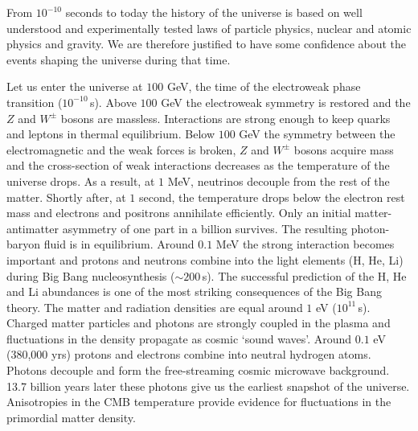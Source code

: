 \documentclass[12pt,letterpaper,rotate]{article}
\begin{document}
{From $10^{-10}$ seconds to today the history of the universe is based on well understood and experimentally tested laws of particle physics, nuclear and atomic physics and gravity.
We are therefore justified to have some confidence about the events shaping the universe during that time.

Let us enter the universe at $100$ GeV, the time of the electroweak phase transition ($10^{-10}$\,s).
Above $100$ GeV the electroweak symmetry is restored and the $Z$ and $W^\pm$ bosons are massless.
Interactions are strong enough to keep quarks and leptons in thermal equilibrium.
Below $100$ GeV the symmetry between the electromagnetic and the weak forces is broken, $Z$ and $W^\pm$ bosons acquire mass and the cross-section of weak interactions decreases as the temperature of the universe drops.
As a result, at $1$ MeV, neutrinos decouple from the rest of the matter.
Shortly after, at $1$ second, the temperature drops below the electron rest mass and electrons  and positrons annihilate efficiently.  Only an initial matter-antimatter asymmetry of one part in a billion survives.
The resulting photon-baryon fluid is in equilibrium.
Around $0.1$ MeV the strong interaction becomes important and protons and neutrons combine into the light elements (H, He, Li) during Big Bang nucleosynthesis ($\sim 200$\,s).  The successful prediction of the H, He and Li abundances is one of the most striking consequences of the Big Bang theory.
The matter and radiation densities are equal around $1$ eV ($10^{11}$\,s).  
Charged matter particles and photons are strongly coupled in the plasma and fluctuations in the density propagate as cosmic `sound waves'.
Around $0.1$ eV (380,000 yrs) protons and electrons combine into neutral hydrogen atoms.
Photons decouple and form the free-streaming cosmic microwave background.
13.7 billion years later these photons give us the earliest snapshot of the universe.
Anisotropies in the CMB temperature provide evidence for fluctuations in the primordial matter density.

}
\end{document}
